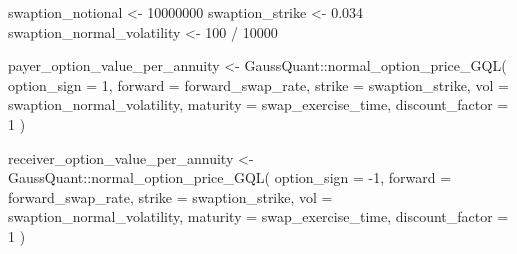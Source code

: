 \documentclass[
  letterpaper,
  DIV=11,
  numbers=noendperiod]{scrreprt}
\newenvironment{Shaded}{\begin{snugshade}}{\end{snugshade}}
\newcommand{\AttributeTok}[1]{\textcolor[rgb]{0.40,0.45,0.13}{#1}}
\newcommand{\DecValTok}[1]{\textcolor[rgb]{0.68,0.00,0.00}{#1}}
\newcommand{\FloatTok}[1]{\textcolor[rgb]{0.68,0.00,0.00}{#1}}
\newcommand{\FunctionTok}[1]{\textcolor[rgb]{0.28,0.35,0.67}{#1}}
\newcommand{\NormalTok}[1]{\textcolor[rgb]{0.00,0.23,0.31}{#1}}
\newcommand{\OtherTok}[1]{\textcolor[rgb]{0.00,0.23,0.31}{#1}}
\newcommand{\SpecialCharTok}[1]{\textcolor[rgb]{0.37,0.37,0.37}{#1}}
\begin{document}
\begin{Shaded}
\begin{Highlighting}[]
\NormalTok{swaption\_notional }\OtherTok{\textless{}{-}} \DecValTok{10000000}
\NormalTok{swaption\_strike }\OtherTok{\textless{}{-}} \FloatTok{0.034}
\NormalTok{swaption\_normal\_volatility }\OtherTok{\textless{}{-}} \DecValTok{100} \SpecialCharTok{/} \DecValTok{10000}

\NormalTok{payer\_option\_value\_per\_annuity }\OtherTok{\textless{}{-}}\NormalTok{ GaussQuant}\SpecialCharTok{::}\FunctionTok{normal\_option\_price\_GQL}\NormalTok{(}
  \AttributeTok{option\_sign =} \DecValTok{1}\NormalTok{,}
  \AttributeTok{forward =}\NormalTok{ forward\_swap\_rate,}
  \AttributeTok{strike =}\NormalTok{ swaption\_strike,}
  \AttributeTok{vol =}\NormalTok{ swaption\_normal\_volatility,}
  \AttributeTok{maturity =}\NormalTok{ swap\_exercise\_time,}
  \AttributeTok{discount\_factor =} \DecValTok{1}
\NormalTok{)}

\NormalTok{receiver\_option\_value\_per\_annuity }\OtherTok{\textless{}{-}}\NormalTok{ GaussQuant}\SpecialCharTok{::}\FunctionTok{normal\_option\_price\_GQL}\NormalTok{(}
  \AttributeTok{option\_sign =} \SpecialCharTok{{-}}\DecValTok{1}\NormalTok{,}
  \AttributeTok{forward =}\NormalTok{ forward\_swap\_rate,}
  \AttributeTok{strike =}\NormalTok{ swaption\_strike,}
  \AttributeTok{vol =}\NormalTok{ swaption\_normal\_volatility,}
  \AttributeTok{maturity =}\NormalTok{ swap\_exercise\_time,}
  \AttributeTok{discount\_factor =} \DecValTok{1}
\NormalTok{)}


\end{Highlighting}
\end{Shaded}
\end{document}
